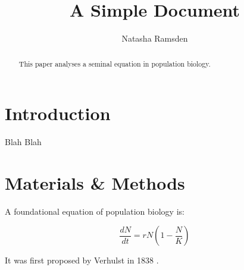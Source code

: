 \documentclass[12pt]{article}
\title{A Simple Document}
\author{Natasha Ramsden}
\date{}
\begin{document}
  \maketitle

  \begin{abstract}
    This paper analyses a seminal equation in population biology.
  \end{abstract}

  \section{Introduction}
    Blah Blah

  \section{Materials \& Methods}

  A foundational equation of population biology is:

  \begin{equation}
    \frac{dN}{dt} = r N (1 - \frac{N}{K})
  \end{equation}

  It was first proposed by Verhulst in 1838 \cite{verhulst1838notice}.


  
\end{document}
